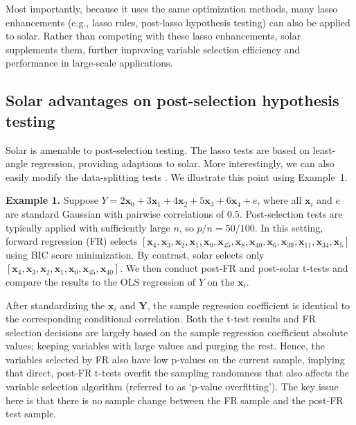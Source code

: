 \documentclass[12pt]{article}
\begin{document}
Most importantly, because it uses the same optimization methods, many lasso enhancements (e.g., lasso rules, post-lasso hypothesis testing) can also be applied to solar. Rather than competing with these lasso enhancements, solar supplements them, further improving variable selection efficiency and performance in large-scale applications.

\subsection{Solar advantages on post-selection hypothesis testing}

Solar is amenable to post-selection testing. The lasso tests \citep{lockhartall14, taylor2014exact} are based on least-angle regression, providing adaptions to solar. More interestingly, we can also easily modify the data-splitting tests \citep{wasserman2009high,meinshausen2009p}. We illustrate this point using Example~1.

\smallskip
\noindent
\textbf{Example 1.} Suppose $Y = 2 \mathbf{x}_0 + 3 \mathbf{x}_1 + 4 \mathbf{x}_2 + 5 \mathbf{x}_3 + 6 \mathbf{x}_4  + e$, where all $\mathbf{x}_i$ and $e$ are standard Gaussian with pairwise correlations of $0.5$. Post-selection tests are typically applied with sufficiently large $n$, so $p/n=50/100$. In this setting, forward regression (FR) selects $\left[\mathbf{x}_4, \mathbf{x}_3, \mathbf{x}_2, \mathbf{x}_1, \mathbf{x}_0, \mathbf{x}_{45}, \mathbf{x}_{8}, \mathbf{x}_{40}, \mathbf{x}_{6}, \mathbf{x}_{39}, \mathbf{x}_{11}, \mathbf{x}_{34}, \mathbf{x}_{5} \right]$ using BIC score minimization. By contrast, solar selects only $\left[\mathbf{x}_4, \mathbf{x}_3, \mathbf{x}_2, \mathbf{x}_1, \mathbf{x}_0, \mathbf{x}_{45}, \mathbf{x}_{40} \right]$. We then conduct post-FR and post-solar t-tests and compare the results to the OLS regression of $Y$ on the $\mathbf{x}_i$.

After standardizing the $\mathbf{x}_i$ and $\mathbf{Y}$, the sample regression coefficient is identical to the corresponding conditional correlation. Both the t-test results and FR selection decisions are largely based on the sample regression coefficient absolute values; keeping variables with large values and purging the rest. Hence, the variables selected by FR also have low p-values on the current sample, implying that direct, post-FR t-tests overfit the sampling randomness that also affects the variable selection algorithm (referred to as `p-value overfitting'). The key issue here is that there is no sample change between the FR sample and the post-FR test sample.
\end{document}

